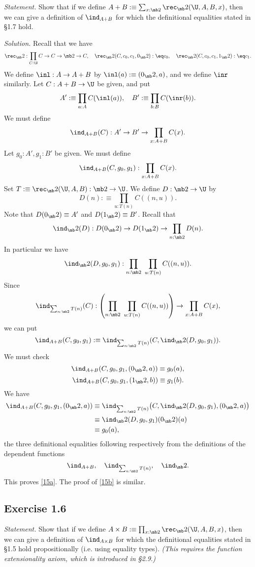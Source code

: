 \documentclass[12pt]{article}
\begin{document}
\emph{Statement.} Show that if we define $A+B:\equiv\sum_{x:\mb2}\rec_\mb2(\U,A,B,x)$, then we can give a definition of $\ind_{A+B}$ for which the definitional equalities stated in \S1.7 hold.

\nn\emph{Solution.} Recall that we have 
$$
\rec_\mb2:\prod_{C:\U}C\to C\to\mb2\to C,\quad\rec_\mb2(C,c_0,c_1,0_\mb2):\eq c_0,\quad\rec_\mb2(C,c_0,c_1,1_\mb2):\eq c_1.
$$
We define $\inl:A\to A+B$ by $\inl(a):\equiv(0_\mb2,a)$, and we define $\inr$ similarly. Let $C:A+B\to\U$ be given, and put 
$$
A':\equiv\prod_{a:A}C(\inl(a)),\quad B':\equiv\prod_{b:B}C(\inr(b)).
$$
We must define 
$$
\ind_{A+B}(C):A'\to B'\to\prod_{x:A+B}C(x).
$$ 
Let $g_0:A',g_1:B'$ be given. We must define 
$$
\ind_{A+B}(C,g_0,g_1):\prod_{x:A+B}C(x).
$$ 
Set $T:\equiv\rec_\mb2(\U,A,B):\mb2\to\U$. We define $D:\mb2\to\U$ by 
$$
D(n):\equiv\prod_{u:T(n)}C((n,u)).
$$ 
Note that $D(0_\mb2)\equiv A'$ and $D(1_\mb2)\equiv B'$. Recall that 
$$
\ind_\mb2(D):D(0_\mb2)\to D(1_\mb2)\to\prod_{n:\mb2}D(n).
$$ 
In particular we have 
$$
\ind_\mb2(D,g_0,g_1):\prod_{n:\mb2}\ \prod_{u:T(n)}C((n,u)).
$$ 
Since 
$$
\ind_{\sum_{n:\mb2}T(n)}(C):\left(\prod_{n:\mb2}\ \prod_{u:T(n)}C((n,u))\right)\to\prod_{x:A+B}C(x),
$$ 
we can put 
$$
\ind_{A+B}(C,g_0,g_1):\equiv\ind_{\sum_{n:\mb2}T(n)}(C,\ind_\mb2(D,g_0,g_1)).
$$ 
We must check 
\begin{equation}\label{15a}
\ind_{A+B}(C,g_0,g_1,(0_\mb2,a))\equiv g_0(a),
\end{equation}
\begin{equation}\label{15b}
\ind_{A+B}(C,g_0,g_1,(1_\mb2,b))\equiv g_1(b).
\end{equation} 
We have 
\begin{align*}
\ind_{A+B}(C,g_0,g_1,(0_\mb2,a))&\equiv\ind_{\sum_{n:\mb2}T(n)}\big(C,\ind_\mb2(D,g_0,g_1),(0_\mb2,a)\big)\\ 
&\equiv\ind_\mb2(D,g_0,g_1)(0_\mb2)(a)\\ 
&\equiv g_0(a),
\end{align*}
the three definitional equalities following respectively from the definitions of the dependent functions
$$
\ind_{A+B},\quad\ind_{\sum_{n:\mb2}T(n)},\quad\ind_\mb2.
$$ 
This proves \eqref{15a}. The proof of \eqref{15b} is similar.


\subsection{Exercise 1.6}

\emph{Statement.} Show that if we define $A\times B:\equiv\prod_{x:\mb2}\rec_\mb2(\U,A,B,x)$, then we can give a definition of  $\ind_{A\times B}$ for which the definitional equalities stated in \S1.5 hold propositionally (i.e. using equality types). \emph{(This requires the function extensionality axiom, which is introduced in \S2.9.)}
\end{document}
